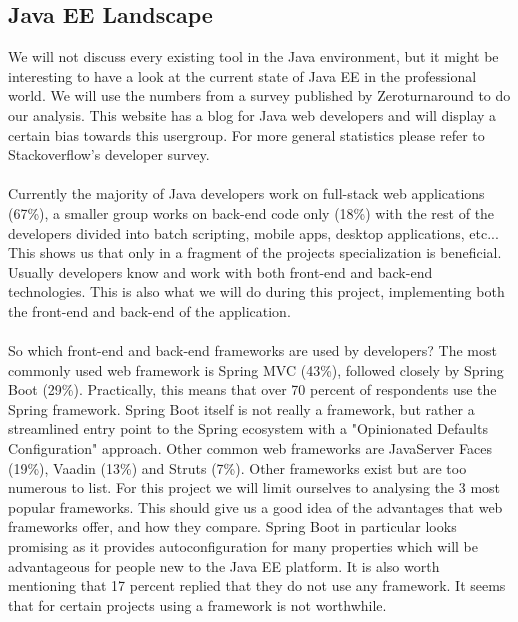 \documentclass[12pt]{article}
\begin{document}
\subsection{Java EE Landscape}
We will not discuss every existing tool in the Java environment, but it might be interesting to have a look at the current state of Java EE in the professional world. We will use the numbers from a survey published by Zeroturnaround to do our analysis.\cite{JavaEELandscape73:online} This website has a blog for Java web developers and will display a certain bias towards this usergroup. For more general statistics please refer to Stackoverflow's developer survey.\cite{DeveloperSurvey95:online}
\\\\
Currently the majority of Java developers work on full-stack web applications (67\%), a smaller group works on back-end code only (18\%) with the rest of the developers divided into batch scripting, mobile apps, desktop applications, etc... This shows us that only in a fragment of the projects specialization is beneficial. Usually developers know and work with both front-end and back-end technologies. This is also what we will do during this project, implementing both the front-end and back-end of the application.
\\\\
So which front-end and back-end frameworks are used by developers? The most commonly used web framework is Spring MVC (43\%), followed closely by Spring Boot (29\%). Practically, this means that over 70 percent of respondents use the Spring framework. Spring Boot itself is not really a framework, but rather a streamlined entry point to the Spring ecosystem with a "Opinionated Defaults Configuration" approach. \cite{SpringBootAdvantages67:online}\cite{SpringBootIntro23:online} Other common web frameworks are JavaServer Faces (19\%), Vaadin (13\%) and Struts (7\%). Other frameworks exist but are too numerous to list. For this project we will limit ourselves to analysing the 3 most popular frameworks. This should give us a good idea of the advantages that web frameworks offer, and how they compare. Spring Boot in particular looks promising as it provides autoconfiguration for many properties which will be advantageous for people new to the Java EE platform. It is also worth mentioning that 17 percent replied that they do not use any framework. It seems that for certain projects using a framework is not worthwhile. %
\\\\
\end{document}
